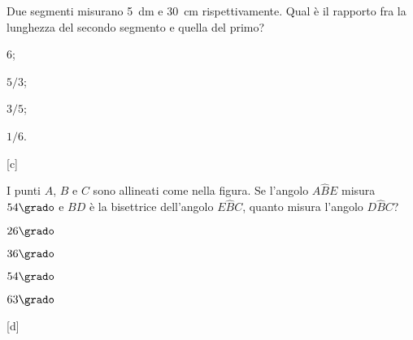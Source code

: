 
\begin{esercizio}
\label{ese:1.131}
Due segmenti misurano 5~dm e 30~cm rispettivamente. Qual è il 
rapporto fra la lunghezza del secondo segmento e quella del primo?
\begin{multicols}{4}
\begin{enumeratea}
\item 6;
\item $5/3$;
\item $3/5$;
\item $1/6$.
\end{enumeratea}
\end{multicols}
\vspace{-2.3em}
\hfill[c]
\end{esercizio}

\begin{esercizio}
\label{ese:1.132}
I punti $A$, $B$ e $C$ sono allineati come nella 
figura. Se l'angolo $A\widehat{B}E$ misura 
$54\grado$ e $BD$ è la bisettrice dell'angolo $E\widehat{B}C$, quanto 
misura l'angolo $D\widehat{B}C$?

\begin{minipage}{.39 \textwidth}
\begin{center}
\begin{inaccessibleblock}
 
\end{inaccessibleblock}
\end{center}
\end{minipage}
\hfill
\begin{minipage}{.55 \textwidth}
\begin{multicols}{2}
\begin{enumeratea}
\item $26\grado$
\item $36\grado$
\item $54\grado$
\item $63\grado$
\end{enumeratea}
\end{multicols}
\vspace{-2.3em}
\hfill[d]
\end{minipage}

\end{esercizio}

